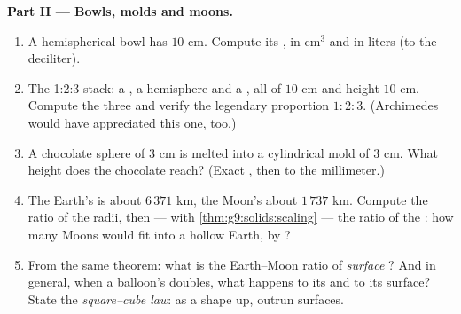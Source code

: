 \begin{problem}
\medskip
\noindent\textbf{Part II --- Bowls, molds and moons.}
\begin{enumerate}[resume]
  \item A hemispherical bowl has  $10$ cm. Compute its
        , in cm$^3$ and in liters (to the deciliter).
  \item The 1:2:3 stack: a , a hemisphere and a ,
        all of  $10$ cm and height $10$ cm. Compute the
        three  and verify the legendary proportion
        $1 : 2 : 3$. (Archimedes would have appreciated this
        one, too.)
  \item A chocolate sphere of  $3$ cm is melted into a
        cylindrical mold of  $3$ cm. What height does the
        chocolate reach? (Exact , then to the
        millimeter.)
  \item The Earth's  is about $6\,371$ km, the Moon's
        about $1\,737$ km. Compute the ratio of the radii, then
        --- with \cref{thm:g9:solids:scaling} --- the ratio of
        the : how many Moons would fit into a hollow
        Earth, by ?
  \item From the same theorem: what is the Earth--Moon ratio of
        \emph{surface }? And in general, when a balloon's
         doubles, what happens to its  and to its
        surface? State the \emph{square--cube law}: as a shape
         up,  outrun surfaces.
\end{enumerate}


\end{problem}
